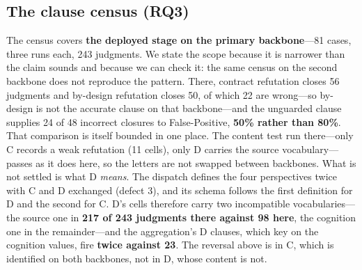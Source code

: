 \documentclass[acmsmall,screen,review,anonymous]{acmart}
\begin{document}
\subsection{The clause census (RQ3)}
\label{sec:census}

The census covers \textbf{the deployed stage on the primary backbone}---81 cases, three runs each,
243 judgments. We state the scope because it is narrower than the claim sounds and because we can
check it: the same census on the second backbone does not reproduce the pattern. There, contract
refutation closes 56 judgments and by-design refutation closes 50, of which 22 are wrong---so
by-design is not the accurate clause on that backbone---and the unguarded clause supplies 24 of 48
incorrect closures to False-Positive, \textbf{50\% rather than 80\%}. That comparison is itself
bounded in one place. The content test run there---only C records a weak refutation (11 cells), only
D carries the source vocabulary---passes as it does here, so the letters are not swapped between
backbones. What is not settled is what D \emph{means}. The dispatch defines the four perspectives
twice with C and D exchanged (defect 3), and its schema follows the first definition for D and the
second for C. D's cells therefore carry two incompatible vocabularies---the source one in \textbf{217
of 243 judgments there against 98 here}, the cognition one in the remainder---and the aggregation's D
clauses, which key on the cognition values, fire \textbf{twice against 23}. The reversal above is in
C, which is identified on both backbones, not in D, whose content is not.
\end{document}
